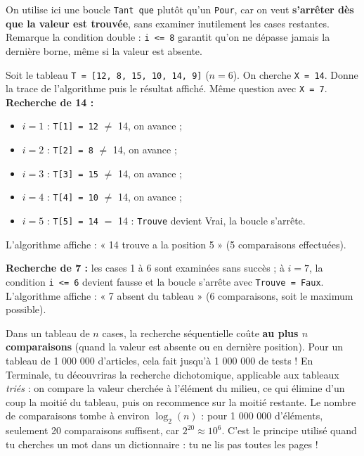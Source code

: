 \documentclass[11pt]{article}
\newcommand{\cle}[1]{{\popxbold\color{popdark}#1}}
\begin{document}
On utilise ici une boucle \texttt{Tant que} plutôt qu'un \texttt{Pour}, car on veut \textbf{s'arrêter dès que la valeur est trouvée}, sans examiner inutilement les cases restantes. Remarque la condition double : \texttt{i <= 8} garantit qu'on ne dépasse jamais la dernière borne, même si la valeur est absente.

\begin{exoresolu}
Soit le tableau \texttt{T = [12, 8, 15, 10, 14, 9]} ($n = 6$). On cherche \texttt{X = 14}. Donne la trace de l'algorithme puis le résultat affiché. Même question avec \texttt{X = 7}.
\tcblower
\textbf{Recherche de 14 :}
\begin{itemize}
\item $i = 1$ : \texttt{T[1] = 12} $\neq$ 14, on avance ;
\item $i = 2$ : \texttt{T[2] = 8} $\neq$ 14, on avance ;
\item $i = 3$ : \texttt{T[3] = 15} $\neq$ 14, on avance ;
\item $i = 4$ : \texttt{T[4] = 10} $\neq$ 14, on avance ;
\item $i = 5$ : \texttt{T[5] = 14} $=$ 14 : \texttt{Trouve} devient Vrai, la boucle s'arrête.
\end{itemize}
L'algorithme affiche : « 14 trouve a la position 5 » (5 comparaisons effectuées).

\textbf{Recherche de 7 :} les cases 1 à 6 sont examinées sans succès ; à $i = 7$, la condition \texttt{i <= 6} devient fausse et la boucle s'arrête avec \texttt{Trouve = Faux}. L'algorithme affiche : « 7 absent du tableau » (6 comparaisons, soit le maximum possible).
\end{exoresolu}

\begin{savaistu}
Dans un tableau de $n$ cases, la recherche séquentielle coûte \textbf{au plus $n$ comparaisons} (quand la valeur est absente ou en dernière position). Pour un tableau de 1 000 000 d'articles, cela fait jusqu'à 1 000 000 de tests ! En Terminale, tu découvriras la \cle{recherche dichotomique}, applicable aux tableaux \emph{triés} : on compare la valeur cherchée à l'élément du milieu, ce qui élimine d'un coup la moitié du tableau, puis on recommence sur la moitié restante. Le nombre de comparaisons tombe à environ $\log_2(n)$ : pour 1 000 000 d'éléments, seulement 20 comparaisons suffisent, car $2^{20} \approx 10^6$. C'est le principe utilisé quand tu cherches un mot dans un dictionnaire : tu ne lis pas toutes les pages !
\end{savaistu}
\end{document}
